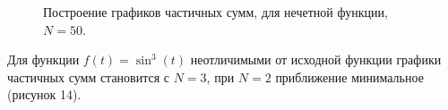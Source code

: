 \documentclass[a5paper, 10pt]{article}
\theoremstyle{definition}
\theoremstyle{plain}
\theoremstyle{remark}
\begin{document}
\begin{figure}[h]
\begin{minipage}[h]{0.5\linewidth}
\end{minipage}
\hfill
\begin{minipage}[h]{0.5\linewidth}
\end{minipage}
\caption{Построение графиков частичных сумм, для нечетной функции, $N=50$.}
\end{figure}

Для функции $f(t) = \sin^3(t)$ неотличимыми от исходной функции графики частичных сумм становится с $N=3$, при $N=2$ приближение минимальное (рисунок 14).
\end{document}
